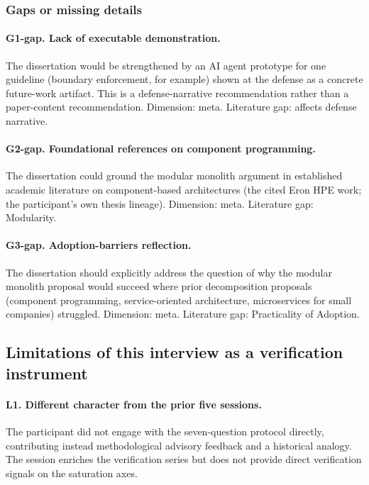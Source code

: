 \subsubsection*{Gaps or missing details}

\paragraph*{G1-gap. Lack of executable demonstration.} The dissertation would be strengthened by an AI agent prototype for one guideline (boundary enforcement, for example) shown at the defense as a concrete future-work artifact. This is a defense-narrative recommendation rather than a paper-content recommendation. Dimension: meta. Literature gap: affects defense narrative.

\paragraph*{G2-gap. Foundational references on component programming.} The dissertation could ground the modular monolith argument in established academic literature on component-based architectures (the cited Eron HPE work; the participant's own thesis lineage). Dimension: meta. Literature gap: Modularity.

\paragraph*{G3-gap. Adoption-barriers reflection.} The dissertation should explicitly address the question of why the modular monolith proposal would succeed where prior decomposition proposals (component programming, service-oriented architecture, microservices for small companies) struggled. Dimension: meta. Literature gap: Practicality of Adoption.

\subsection*{Limitations of this interview as a verification instrument}

\paragraph*{L1. Different character from the prior five sessions.} The participant did not engage with the seven-question protocol directly, contributing instead methodological advisory feedback and a historical analogy. The session enriches the verification series but does not provide direct verification signals on the saturation axes.

